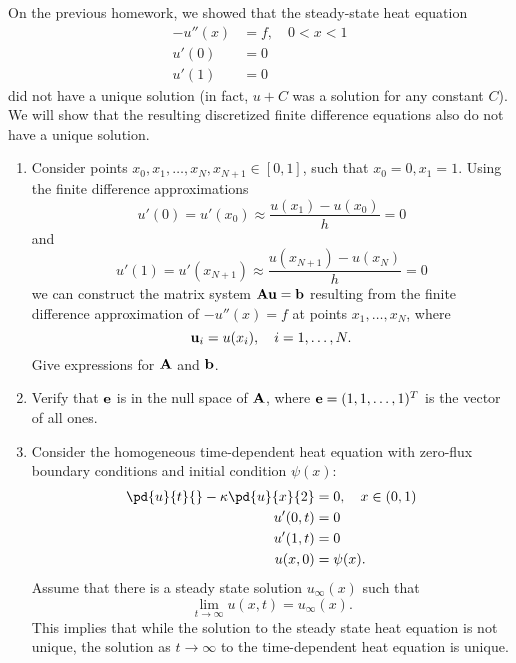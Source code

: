 On the previous homework, we showed that the steady-state heat equation 
\begin{align*}
-u''(x) &= f, \quad 0 < x < 1\\
u'(0) &= 0\\
u'(1) &= 0
\end{align*}
did not have a unique solution (in fact, $u+C$ was a solution for any constant $C$).  We will show that the resulting discretized finite difference equations also do not have a unique solution.  
\begin{enumerate}
\item Consider points $x_0, x_1, \ldots, x_N, x_{N+1} \in [0,1]$, such that $x_0 = 0, x_1 = 1$.  Using the finite difference approximations 
\[
u'(0) = u'(x_0) \approx \frac{u(x_1)-u(x_0)}{h} = 0
\]
and
\[
u'(1) = u'(x_{N+1}) \approx \frac{u(x_{N+1})-u(x_N)}{h} = 0
\]
we can construct the matrix system ${\bf A}{\bf u} = {\bf b}$ resulting from the finite difference approximation of $-u''(x)=f$ at points $x_1, \ldots, x_N$, where
\[
{\bf u}_i = u(x_i), \quad i = 1,\ldots, N.
\]
Give expressions for ${\bf A}$ and $\bf b$.
\item Verify that $\bf e$ is in the null space of ${\bf A}$, where ${\bf e} = (1,1,\ldots, 1)^T$ is the vector of all ones.  
\item Consider the homogeneous time-dependent heat equation with zero-flux boundary conditions and initial condition $\psi(x)$:
\begin{align*}
\pd{u}{t}{}-\kappa\pd{u}{x}{2} &= 0, \quad x\in (0,1)\\
u'(0,t) &= 0\\
u'(1,t) &= 0\\
u(x,0) &= \psi(x).
\end{align*}
Assume that there is a steady state solution $u_\infty(x)$ such that
\[
\lim_{t \rightarrow \infty} u(x,t)= u_\infty(x).
\]
This implies that while the solution to the steady state heat equation is not unique, the solution as $t\rightarrow \infty$ to the time-dependent  heat equation is unique.  

\end{enumerate}